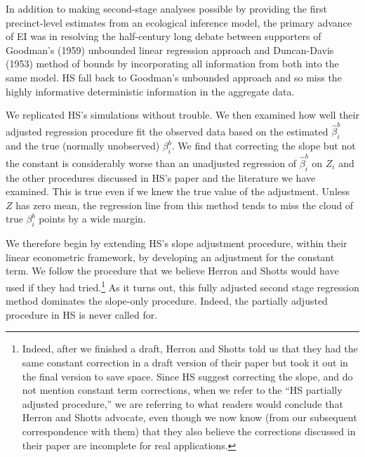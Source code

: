\documentclass[11pt,titlepage]{article}
\begin{document}
In addition to making second-stage analyses possible by providing the
first precinct-level estimates from an ecological inference model, the
primary advance of EI was in resolving the half-century long debate
between supporters of Goodman's (1959) unbounded linear regression
approach and Duncan-Davis (1953) method of bounds by incorporating
all information from both into the same model.  HS fall back to
Goodman's unbounded approach and so miss the highly informative
deterministic information in the aggregate data.

We replicated HS's simulations without trouble.  We then examined how
well their adjusted regression procedure fit the observed data based
on the estimated $\hat\beta_i^b$ and the true (normally unobserved)
$\beta_i^b$.  We find that correcting the slope but not the constant
is considerably worse than an unadjusted regression of $\hat\beta_i^b$
on $Z_i$ and the other procedures discussed in HS's paper and the
literature we have examined.  This is true even if we knew the true
value of the adjustment.  Unless $Z$ has zero mean, the regression
line from this method tends to miss the cloud of true $\beta_i^b$
points by a wide margin.

We therefore begin by extending HS's slope adjustment procedure,
within their linear econometric framework, by developing an adjustment
for the constant term.  We follow the procedure that we believe Herron
and Shotts would have used if they had tried.\footnote{Indeed, after
  we finished a draft, Herron and Shotts told us that they had the
  same constant correction in a draft version of their paper but took
  it out in the final version to save space.  Since HS suggest
  correcting the slope, and do not mention constant term corrections,
  when we refer to the ``HS partially adjusted procedure,'' we are
  referring to what readers would conclude that Herron and Shotts
  advocate, even though we now know (from our subsequent
  correspondence with them) that they also believe the corrections
  discussed in their paper are incomplete for real applications.}  As
it turns out, this fully adjusted second stage regression method
dominates the slope-only procedure.  Indeed, the partially adjusted
procedure in HS is never called for.
\end{document}
